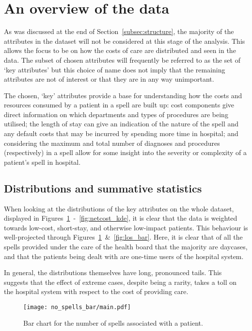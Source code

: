 \section{An overview of the data}\label{sec:overview}

As was discussed at the end of Section~\ref{subsec:structure}, the majority of
the attributes in the dataset will not be considered at this stage of the
analysis. This allows the focus to be on how the costs of care are distributed
and seen in the data. The subset of chosen attributes will frequently be
referred to as the set of `key attributes' but this choice of name does not
imply that the remaining attributes are not of interest or that they are in any
way unimportant.

The chosen, `key' attributes provide a base for understanding how the
costs and resources consumed by a patient in a spell are built up: cost
components give direct information on which departments and types of procedures
are being utilised; the length of stay can give an indication of the nature of
the spell and any default costs that may be incurred by spending more time in
hospital; and considering the maximum and total number of diagnoses and
procedures (respectively) in a spell allow for some insight into the severity or
complexity of a patient's spell in hospital.


\subsection{Distributions and summative statistics}%
\label{subsec:distributions_statistics}

When looking at the distributions of the key attributes on the whole dataset,
displayed in Figures~\ref{fig:no_spells_bar}~\--~\ref{fig:netcost_kde}, it
is clear that the data is weighted towards low-cost, short-stay, and
otherwise low-impact patients. This behaviour is well-projected through
Figures~\ref{fig:no_spells_bar}~\&~\ref{fig:los_bar}. Here, it is clear that of
all the spells provided under the care of the health board that the majority are
daycases, and that the patients being dealt with are one-time users of the
hospital system.

In general, the distributions themselves have long, pronounced tails. This
suggests that the effect of extreme cases, despite being a rarity, takes a toll
on the hospital system with respect to the cost of providing care.

\begin{figure}[htbp]
    \centering
    \texttt{[image: no\_spells\_bar/main.pdf]}
    \caption{Bar chart for the number of spells associated with a patient.}%
    \label{fig:no_spells_bar}
\end{figure}

